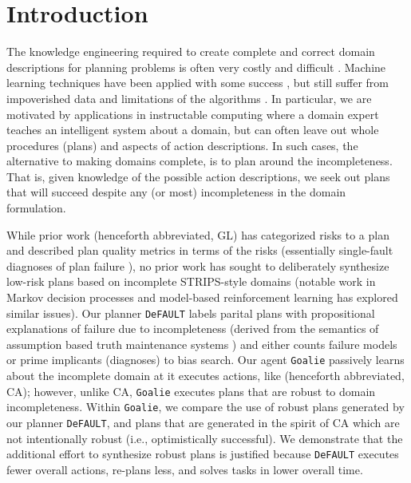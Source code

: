 \documentclass{article}
\def\citep#1{\cite{#1}} \def\citet#1{\citeA{#1}}
\def\default{{\tt DeFAULT}}
\def\goalie{{\tt Goalie}}
\begin{document}
\section{Introduction}
The knowledge engineering required to create complete and correct domain
descriptions for planning problems is often very costly and difficult
\citep{modellite,arms}.  Machine learning techniques have been applied with some
success \citep{arms}, but still suffer from impoverished data and limitations of
the algorithms \citep{modellite}.   In particular, we are motivated by
applications in instructable computing \citep{mable} where a domain expert
teaches an intelligent system about a domain, but can often leave out whole
procedures (plans) and aspects of action descriptions.   In such cases, the
alternative to making domains complete, is to plan around the incompleteness. 
That is, given knowledge of the possible action descriptions, we seek out plans
that will succeed despite any (or most) incompleteness in the domain
formulation.

While prior work \citep{Garland02} (henceforth abbreviated, GL) has categorized
risks to a plan and described plan quality metrics in terms of the risks
(essentially single-fault diagnoses of plan failure \citep{dekleer}), no
prior work has sought to deliberately synthesize low-risk plans based on
incomplete STRIPS-style domains (notable work in Markov decision processes
\citep{NE:05}  and model-based reinforcement learning \citep{citeulike:112017}
has explored similar issues).  Our planner \default{} labels parital
plans with propositional explanations of failure due to incompleteness (derived
from the semantics of assumption based truth maintenance systems
\cite{USU-CS-TR-11-001}) and either counts failure models or prime implicants (diagnoses) to bias search.
Our agent \goalie{} passively learns about the incomplete domain at it
executes actions, like \citet{DBLP:conf/aips/ChangA06} (henceforth
abbreviated, CA); however, unlike CA, \goalie{} executes plans that are robust
to domain incompleteness.  Within \goalie{}, we compare the use of robust plans
generated by our planner \default{}, and plans that are generated in the
spirit of CA which are not intentionally robust (i.e., optimistically
successful).  We demonstrate that the additional effort to synthesize robust
plans is justified because \default{} executes fewer overall actions, re-plans
less, and solves tasks in lower overall time.
\end{document}

